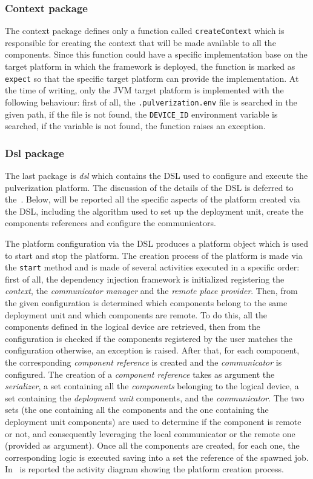 \subsubsection{Context package}

The context package defines only a function called \texttt{createContext} which is responsible for creating the context that will be made available to
all the components. Since this function could have a specific implementation base on the target platform in which the framework is deployed, the
function is marked as \texttt{expect} so that the specific target platform can provide the implementation. At the time of writing, only the JVM
target platform is implemented with the following behaviour: first of all, the \texttt{.pulverization.env} file is searched in the given path, if
the file is not found, the \texttt{DEVICE\_ID} environment variable is searched, if the variable is not found, the function raises an exception.

\subsubsection{Dsl package}

The last package is \emph{dsl} which contains the DSL used to configure and execute the pulverization platform. The discussion of the details of
the DSL is deferred to the~.
Below, will be reported all the specific aspects of the platform created via the DSL, including the algorithm used to set up the deployment unit,
create the components references and configure the communicators.

The platform configuration via the DSL produces a platform object which is used to start and stop the platform.
The creation process of the platform is made via the \texttt{start} method and is made of several activities executed in a specific order: first of
all, the dependency injection framework is initialized registering the \emph{context}, the \emph{communicator manager} and the
\emph{remote place provider}.
Then, from the given configuration is determined which components belong to the same deployment unit and which components are remote.
To do this, all the components defined in the logical device are retrieved, then from the configuration is checked if the components registered by
the user matches the configuration otherwise, an exception is raised.
After that, for each component, the corresponding \emph{component reference} is created and the \emph{communicator} is configured.
The creation of a \emph{component reference} takes as argument the \emph{serializer}, a set containing all the \emph{components} belonging to
the logical device, a set containing the \emph{deployment unit} components, and the \emph{communicator}.
The two sets (the one containing all the components and the one containing the deployment unit components) are used to determine if
the component is remote or not, and consequently leveraging the local communicator or the remote one (provided as argument).
Once all the components are created, for each one, the corresponding logic is executed saving into a set the reference of the spawned job.
In~ is reported the activity diagram showing the platform creation process.

